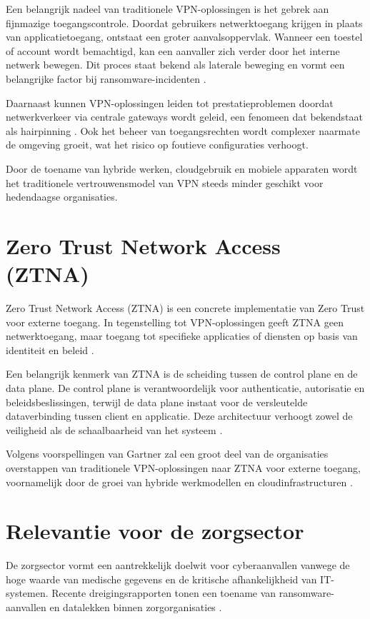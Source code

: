 Een belangrijk nadeel van traditionele VPN-oplossingen is het gebrek aan fijnmazige toegangscontrole. Doordat gebruikers netwerktoegang krijgen in plaats van applicatietoegang, ontstaat een groter aanvalsoppervlak. Wanneer een toestel of account wordt bemachtigd, kan een aanvaller zich verder door het interne netwerk bewegen. Dit proces staat bekend als laterale beweging en vormt een belangrijke factor bij ransomware-incidenten \autocite{barracuda2024}.

Daarnaast kunnen VPN-oplossingen leiden tot prestatieproblemen doordat netwerkverkeer via centrale gateways wordt geleid, een fenomeen dat bekendstaat als hairpinning \autocite{seqrite2025}. Ook het beheer van toegangsrechten wordt complexer naarmate de omgeving groeit, wat het risico op foutieve configuraties verhoogt.

Door de toename van hybride werken, cloudgebruik en mobiele apparaten wordt het traditionele vertrouwensmodel van VPN steeds minder geschikt voor hedendaagse organisaties.

\section{Zero Trust Network Access (ZTNA)}

Zero Trust Network Access (ZTNA) is een concrete implementatie van Zero Trust voor externe toegang. In tegenstelling tot VPN-oplossingen geeft ZTNA geen netwerktoegang, maar toegang tot specifieke applicaties of diensten op basis van identiteit en beleid \autocite{nflo2025}.

Een belangrijk kenmerk van ZTNA is de scheiding tussen de control plane en de data plane. De control plane is verantwoordelijk voor authenticatie, autorisatie en beleidsbeslissingen, terwijl de data plane instaat voor de versleutelde dataverbinding tussen client en applicatie. Deze architectuur verhoogt zowel de veiligheid als de schaalbaarheid van het systeem \autocite{terrazone2025}.

Volgens voorspellingen van Gartner zal een groot deel van de organisaties overstappen van traditionele VPN-oplossingen naar ZTNA voor externe toegang, voornamelijk door de groei van hybride werkmodellen en cloudinfrastructuren \autocite{gartner2022}.

\section{Relevantie voor de zorgsector}

De zorgsector vormt een aantrekkelijk doelwit voor cyberaanvallen vanwege de hoge waarde van medische gegevens en de kritische afhankelijkheid van IT-systemen. Recente dreigingsrapporten tonen een toename van ransomware-aanvallen en datalekken binnen zorgorganisaties \autocite{zcert2024}.

